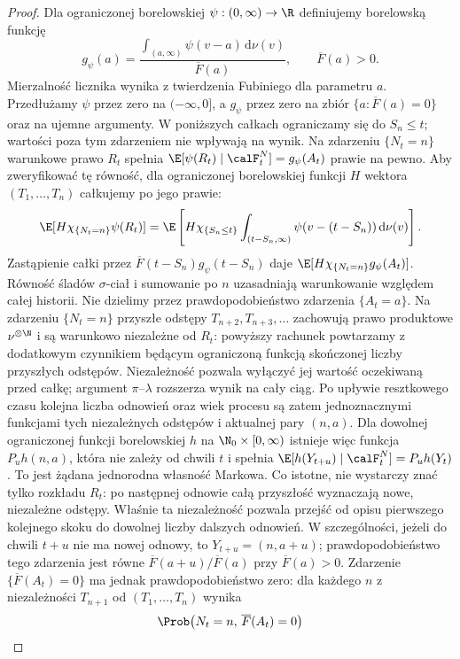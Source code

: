 \begin{proof}
Dla ograniczonej borelowskiej $\psi:(0,\infty)\to\R$
definiujemy borelowską funkcję
\[
g_\psi(a)=\frac{\int_{(a,\infty)}\psi(v-a)\,\mathrm d\nu(v)}
{\overline F(a)},\qquad \overline F(a)>0.
\]
Mierzalność licznika wynika z twierdzenia Fubiniego
dla parametru $a$. Przedłużamy $\psi$ przez zero
na $(-\infty,0]$, a $g_\psi$ przez zero na zbiór
$\{a:\overline F(a)=0\}$ oraz na ujemne argumenty.
W poniższych całkach ograniczamy się do $S_n\le t$;
wartości poza tym zdarzeniem nie wpływają na wynik. Na zdarzeniu $\{N_t=n\}$
warunkowe prawo $R_t$ spełnia
$\E[\psi(R_t)\mid\calF_t^N]=g_\psi(A_t)$
prawie na pewno. Aby zweryfikować tę równość,
dla ograniczonej borelowskiej funkcji $H$ wektora
$(T_1,\ldots,T_n)$ całkujemy po jego prawie:
\[
\E[H\chi_{\{N_t=n\}}\psi(R_t)]
=\E\left[H\chi_{\{S_n\le t\}}
\int_{(t-S_n,\infty)}\psi(v-(t-S_n))\,\mathrm d\nu(v)\right].
\]
Zastąpienie całki przez
$\overline F(t-S_n)g_\psi(t-S_n)$ daje
$\E[H\chi_{\{N_t=n\}}g_\psi(A_t)]$.
Równość śladów $\sigma$-ciał i sumowanie po $n$
uzasadniają warunkowanie względem całej historii.
Nie dzielimy przez prawdopodobieństwo zdarzenia
$\{A_t=a\}$.
Na zdarzeniu $\{N_t=n\}$ przyszłe odstępy
$T_{n+2},T_{n+3},\ldots$ zachowują prawo
produktowe $\nu^{\otimes\N}$ i są warunkowo niezależne
od $R_t$: powyższy rachunek powtarzamy z dodatkowym
czynnikiem będącym ograniczoną funkcją skończonej
liczby przyszłych odstępów. Niezależność pozwala
wyłączyć jej wartość oczekiwaną przed całkę;
argument $\pi$--$\lambda$ rozszerza wynik na cały ciąg. Po upływie resztkowego
czasu kolejna liczba odnowień oraz wiek procesu są zatem
jednoznacznymi funkcjami tych niezależnych odstępów i
aktualnej pary $(n,a)$. Dla dowolnej ograniczonej funkcji
borelowskiej $h$ na $\N_0\times[0,\infty)$ istnieje więc
funkcja $P_uh(n,a)$, która nie zależy od chwili $t$ i spełnia
$\E[h(Y_{t+u})\mid\calF_t^N]=P_uh(Y_t)$.
To jest żądana jednorodna własność Markowa.
Co istotne, nie wystarczy znać tylko rozkładu $R_t$:
po następnej odnowie całą przyszłość wyznaczają nowe,
niezależne odstępy. Właśnie ta niezależność pozwala
przejść od opisu pierwszego kolejnego skoku do dowolnej
liczby dalszych odnowień.
W szczególności, jeżeli do chwili $t+u$ nie ma nowej odnowy,
to $Y_{t+u}=(n,a+u)$; prawdopodobieństwo tego zdarzenia
jest równe $\overline F(a+u)/\overline F(a)$ przy
$\overline F(a)>0$. Zdarzenie $\{\overline F(A_t)=0\}$
ma jednak prawdopodobieństwo zero: dla każdego $n$ z niezależności
$T_{n+1}$ od $(T_1,\ldots,T_n)$ wynika
\[
\begin{aligned}
&\Prob\bigl(N_t=n,\,\overline F(A_t)=0\bigr)\\

\end{aligned}\]
\end{proof}
